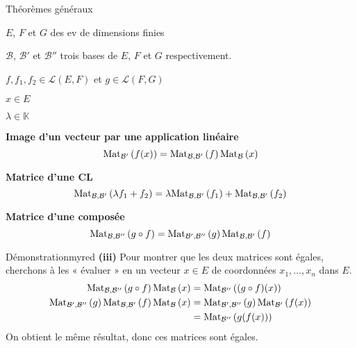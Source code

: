     \begin{prop}{Théorèmes généraux}{}
        \begin{soit}
            \item $E$, $F$ et $G$ des ev de dimensions finies 
            \item $\mathcal{B}$, $\mathcal{B}'$ et $\mathcal{B}''$ trois bases de $E$, $F$ et $G$ respectivement.
            \item $f, f_1, f_2 \in \mathcal{L}(E,F)$ et $g \in \mathcal{L}(F,G)$
            \item $x \in E$
            \item $\lambda \in \mathbb{K}$
        \end{soit}
        \begin{alors}
            \item \textbf{Image d’un vecteur par une application linéaire} \[ \text{Mat}_{\mathcal{B}'}\left(f(x)\right) = \text{Mat}_{\mathcal{B},\mathcal{B}'}\left(f\right) \text{Mat}_{\mathcal{B}}\left(x\right) \]
            \item \textbf{Matrice d’une CL} \[ \text{Mat}_{\mathcal{B},\mathcal{B}'}\left(\lambda f_1 + f_2\right) = \lambda \text{Mat}_{\mathcal{B},\mathcal{B}'}\left(f_1\right) + \text{Mat}_{\mathcal{B},\mathcal{B}'}\left(f_2\right) \]
            \item \textbf{Matrice d’une composée} \[ \text{Mat}_{\mathcal{B},\mathcal{B}''}\left(g \circ f\right) = \text{Mat}_{\mathcal{B}',\mathcal{B}''}\left(g\right) \text{Mat}_{\mathcal{B},\mathcal{B}'}\left(f\right) \]
        \end{alors}
    \end{prop}

    \begin{demo}{Démonstration}{myred}
        \textbf{(iii)} \quad Pour montrer que les deux matrices sont égales, cherchons à les « évaluer » en un vecteur $x \in E$ de coordonnées $x_1,\ldots,x_n$ dans $E$.
        \begin{align*}
            \text{Mat}_{\mathcal{B},\mathcal{B}''}\left(g \circ f\right)\text{Mat}_{\mathcal{B}}\left(x\right) &= \text{Mat}_{\mathcal{B}''}\left((g \circ f)(x)\right) \\
            \text{Mat}_{\mathcal{B}',\mathcal{B}''}\left(g\right) \text{Mat}_{\mathcal{B},\mathcal{B}'}\left(f\right) \text{Mat}_{\mathcal{B}}\left(x\right) &=  \text{Mat}_{\mathcal{B}',\mathcal{B}''}\left(g\right) \text{Mat}_{\mathcal{B}'}\left(f(x)\right) \\
            &= \text{Mat}_{\mathcal{B}''}\left(g(f(x))\right)
        \end{align*}
        On obtient le même résultat, donc ces matrices sont égales.
    \end{demo}

